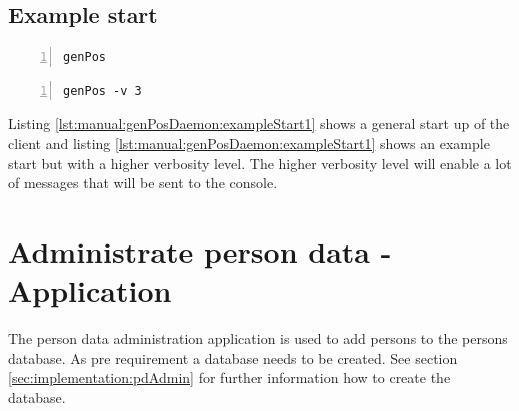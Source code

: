   \subsection{Example start}
   \begin{lstlisting}[frame=single,breaklines,basicstyle=\footnotesize,numbers=left,label=lst:manual:genPosDaemon:exampleStart1,captionpos=b,caption={Example start of the generate position daemon}]
genPos
   \end{lstlisting}
   \begin{lstlisting}[frame=single,breaklines,basicstyle=\footnotesize,numbers=left,label=lst:manual:genPosDaemon:exampleStart2,captionpos=b,caption={Example start of the generate position daemon with higher verbosity}]
genPos -v 3
   \end{lstlisting}
   Listing \ref{lst:manual:genPosDaemon:exampleStart1} shows a general start up of the client and listing \ref{lst:manual:genPosDaemon:exampleStart1} shows an example start but with a higher verbosity level. The higher verbosity level will enable a lot of messages that will be sent to the console.

 \section{Administrate person data - Application}
  The person data administration application is used to add persons to the persons database. As pre requirement a database needs to be created. See section \ref{sec:implementation:pdAdmin} for further information how to create the database.

